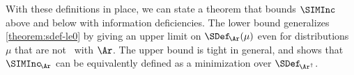 With these definitions in place,
we can state a theorem that bounds $\SIMInc$ above and below with information deficiencies. 
The lower bound generalizes \cref{theorem:sdef-le0} by giving an upper limit on $\SDef_{\!\Ar}(\mu)$ even for distributions $\mu$ that are 
not \scible\ with $\Ar$.
The upper bound is tight in general, and shows that $\SIMInc_{\!\Ar}$ can be equivalently defined as a minimization over 
    $\SDef_{\!\Ar^\dagger}$.

